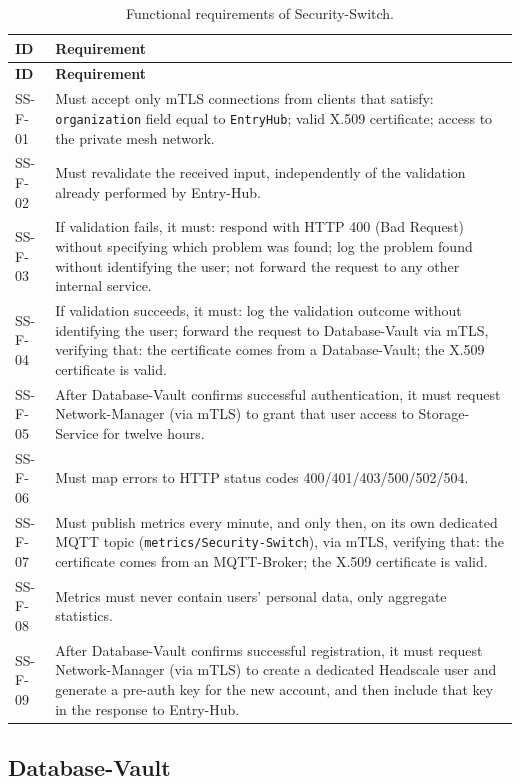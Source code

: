 \begin{longtable}{p{2.6cm} p{\dimexpr\linewidth-2.6cm-4\tabcolsep\relax}}
\caption{Functional requirements of Security-Switch.} \\
\hline
\textbf{ID} & \textbf{Requirement} \\
\hline
\endfirsthead
\hline
\textbf{ID} & \textbf{Requirement} \\
\hline
\endhead
\hline
\endfoot
\hline
\endlastfoot
SS-F-01 & Must accept only mTLS connections from clients that satisfy: \texttt{organization} field equal to \texttt{EntryHub}; valid X.509 certificate; access to the private mesh network. \\
SS-F-02 & Must revalidate the received input, independently of the validation already performed by Entry-Hub. \\
SS-F-03 & If validation fails, it must: respond with HTTP 400 (Bad Request) without specifying which problem was found; log the problem found without identifying the user; not forward the request to any other internal service. \\
SS-F-04 & If validation succeeds, it must: log the validation outcome without identifying the user; forward the request to Database-Vault via mTLS, verifying that: the certificate comes from a Database-Vault; the X.509 certificate is valid. \\
SS-F-05 & After Database-Vault confirms successful authentication, it must request Network-Manager (via mTLS) to grant that user access to Storage-Service for twelve hours. \\
SS-F-06 & Must map errors to HTTP status codes 400/401/403/500/502/504. \\
SS-F-07 & Must publish metrics every minute, and only then, on its own dedicated MQTT topic (\texttt{metrics/Security-Switch}), via mTLS, verifying that: the certificate comes from an MQTT-Broker; the X.509 certificate is valid. \\
SS-F-08 & Metrics must never contain users' personal data, only aggregate statistics. \\
SS-F-09 & After Database-Vault confirms successful registration, it must request Network-Manager (via mTLS) to create a dedicated Headscale user and generate a pre-auth key for the new account, and then include that key in the response to Entry-Hub. \\
\end{longtable}

\subsection{Database-Vault}

